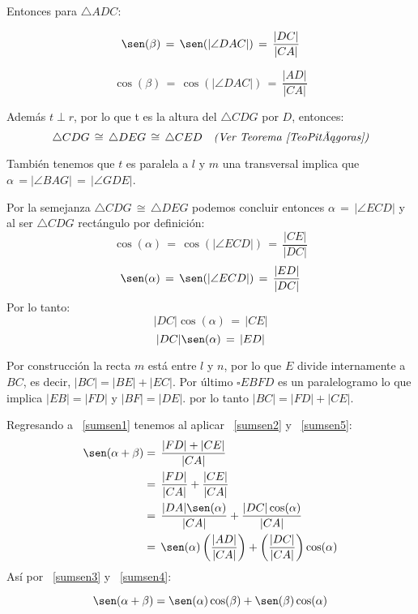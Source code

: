 \begin{pba}
Entonces para $\triangle ADC$:

\begin{equation}\label{sumsen3}
\sen(\beta)\,=\,\sen(|\angle DAC|)\,=\,\frac{|DC|}{|CA|}
\end{equation}

\begin{equation}\label{sumsen4}
\cos(\beta)\,=\,\cos(|\angle DAC|)\,=\,\frac{|AD|}{|CA|}
\end{equation}


Además $t \perp r$, por lo que t es la altura del $\triangle CDG$ por $D$, entonces:
\[ \triangle CDG\, \cong \, \triangle DEG\, \cong \, \triangle CED \quad \textit{(Ver Teorema~\ref{TeoPitágoras})} \]

También tenemos que $t$ es paralela a $l$ y $m$ una transversal implica que $\alpha\,=|\angle BAG|\,=\,|\angle GDE|$.

Por la semejanza $\triangle CDG\, \cong \, \triangle DEG$ podemos concluir entonces $\alpha\,=\,|\angle ECD|$ y al ser $\triangle CDG$ rectángulo por definición:
\[ \cos(\alpha)\,= \,\cos(|\angle ECD|)\,=\,\frac{|CE|}{|DC|}\]
\[ \sen(\alpha)\,= \,\sen(|\angle ECD|)\,=\,\frac{|ED|}{|DC|}\]
Por lo tanto:
\begin{equation}\label{sumsen5}
|DC|\cos(\alpha)\,=\,|CE|
\end{equation}
\begin{equation}\label{sumcos3}
|DC|\sen(\alpha)\,=\,|ED|
\end{equation}

Por construcción la recta $m$ está entre $l$ y $n$, por lo que $E$ divide internamente a $BC$, es decir, $|BC|=|BE|+|EC|$. Por último $\square EBFD$ es un paralelogramo lo que implica $|EB|=|FD|$ y $|BF|=|DE|$. por lo tanto $|BC|=|FD|+|CE|$.


Regresando a ~\ref{sumsen1} tenemos al aplicar ~\ref{sumsen2} y ~\ref{sumsen5}:
\begin{align*}
 \sen(\alpha+\beta)  
&=\,\frac{|FD|+|CE|}{|CA|}\\
&=\,\frac{|FD|}{|CA|} + \frac{|CE|}{|CA|}\\
&=\,\frac{|DA|\sen(\alpha)}{|CA|} + \frac{|DC|\cos(\alpha)}{|CA|}\\
&=\,\sen(\alpha)\left(\frac{|AD|}{|CA|}\right) + \left(\frac{|DC|}{|CA|}\right)\cos(\alpha)\\
\end{align*}
Así por ~\ref{sumsen3} y ~\ref{sumsen4}:

\[ \sen(\alpha + \beta) = \sen(\alpha)\cos(\beta) + \sen(\beta)\cos(\alpha) \]
  

\end{pba}
